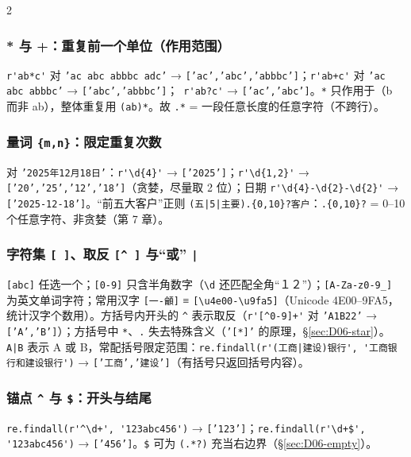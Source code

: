 \begin{multicols}{2}
\subsubsection{* 与 +：重复前一个单位（作用范围）}
\lstinline|r'ab*c'| 对 \texttt{'ac abc abbbc adc'} → \texttt{['ac','abc','abbbc']}；\lstinline|r'ab+c'| 对 \texttt{'ac abc abbbc'} → \texttt{['abc','abbbc']}；\tagext\ \lstinline|r'ab?c'| → \texttt{['ac','abc']}。\texttt{*} 只作用于（b 而非 ab），整体重复用 \texttt{(ab)*}。故 \texttt{.*} = 一段任意长度的任意字符（不跨行）。

\subsubsection{\texorpdfstring{量词 \texttt{\{m,n\}}：限定重复次数 \tagext}{量词 \{m,n\}：限定重复次数（拓展）}}
对 \texttt{'2025年12月18日'}：\lstinline|r'\d{4}'| → \texttt{['2025']}；\lstinline|r'\d{1,2}'| → \texttt{['20','25','12','18']}（贪婪，尽量取 2 位）；日期 \lstinline|r'\d{4}-\d{2}-\d{2}'| → \texttt{['2025-12-18']}。“前五大客户”正则 \texttt{(五|5|主要).\{0,10\}?客户}：\texttt{.\{0,10\}?} = 0–10 个任意字符、非贪婪（第 7 章）。

\subsubsection{\texorpdfstring{字符集 \texttt{[ ]}、取反 \texttt{[\^{} ]} 与“或” \texttt{|} \tagext}{字符集 [ ]、取反与“或”（拓展）}}
\texttt{[abc]} 任选一个；\texttt{[0-9]} 只含半角数字（\texttt{\textbackslash d} 还匹配全角“１２”）；\texttt{[A-Za-z0-9\_]} 为英文单词字符；常用汉字 \texttt{[一-龥]} ≡ \lstinline|[\u4e00-\u9fa5]|（Unicode 4E00–9FA5，统计汉字个数用）。方括号内开头的 \texttt{\^{}} 表示取反（\lstinline|r'[^0-9]+'| 对 \texttt{'A1B22'} → \texttt{['A','B']}）；方括号中 \texttt{*}、\texttt{.} 失去特殊含义（\texttt{'[*]'} 的原理，§\ref{sec:D06-star}）。\texttt{A|B} 表示 A 或 B，常配括号限定范围：\lstinline!re.findall(r'(工商|建设)银行', '工商银行和建设银行')! → \texttt{['工商','建设']}（有括号只返回括号内容）。

\subsubsection{\texorpdfstring{锚点 \texttt{\^{}} 与 \texttt{\$}：开头与结尾 \tagext}{锚点 \textasciicircum{} 与 \$：开头与结尾（拓展）}}
\lstinline|re.findall(r'^\d+', '123abc456')| → \texttt{['123']}；\lstinline|re.findall(r'\d+$', '123abc456')| → \texttt{['456']}。\texttt{\$} 可为 \texttt{(.*?)} 充当右边界（§\ref{sec:D06-empty}）。
\end{multicols}

